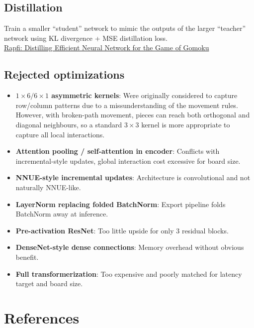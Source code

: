 \documentclass[11pt,a4paper]{article}
\begin{document}
\subsection{Distillation}
Train a smaller ``student'' network to mimic the outputs of the larger ``teacher'' network using KL divergence + MSE distillation loss.\\
\href{https://arxiv.org/html/2503.13178}{Rapfi: Distilling Efficient Neural Network for the Game of Gomoku}

\subsection{Rejected optimizations}
\begin{itemize}
  \item \textbf{$1\times6/6\times1$ asymmetric kernels}: Were originally considered to capture row/column patterns due to a missunderstanding of the movement rules. However, with broken-path movement, pieces can reach both orthogonal and diagonal neighbours, so a standard $3\times3$ kernel is more appropriate to capture all local interactions.
  \item \textbf{Attention pooling / self-attention in encoder}: Conflicts with incremental-style updates, global interaction cost excessive for board size.
  \item \textbf{NNUE-style incremental updates}: Architecture is convolutional and not naturally NNUE-like.
  \item \textbf{LayerNorm replacing folded BatchNorm}: Export pipeline folds BatchNorm away at inference.
  \item \textbf{Pre-activation ResNet}: Too little upside for only 3 residual blocks.
  \item \textbf{DenseNet-style dense connections}: Memory overhead without obvious benefit.
  \item \textbf{Full transformerization}: Too expensive and poorly matched for latency target and board size.
\end{itemize}

\clearpage
\section{References}
\end{document}
